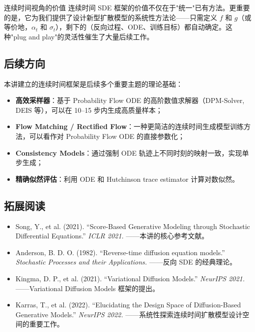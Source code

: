 \documentclass[a4paper]{article}
\begin{document}
\begin{importantbox}{连续时间视角的价值}
连续时间 SDE 框架的价值不仅在于"统一"已有方法。更重要的是，它为我们提供了设计新型扩散模型的系统性方法论——只需定义 $f$ 和 $g$（或等价地，$\alpha_t$ 和 $\sigma_t$），剩下的（反向过程、ODE、训练目标）都自动确定。这种"plug and play"的灵活性催生了大量后续工作。
\end{importantbox}

\subsection{后续方向}

本讲建立的连续时间框架是后续多个重要主题的理论基础：

\begin{itemize}
    \item \textbf{高效采样器}：基于 Probability Flow ODE 的高阶数值求解器（DPM-Solver, DEIS 等），可以在 10--15 步内生成高质量样本；
    \item \textbf{Flow Matching / Rectified Flow}：一种更简洁的连续时间生成模型训练方法，可以看作对 Probability Flow ODE 的直接参数化；
    \item \textbf{Consistency Models}：通过强制 ODE 轨迹上不同时刻的映射一致，实现单步生成；
    \item \textbf{精确似然评估}：利用 ODE 和 Hutchinson trace estimator 计算对数似然。
\end{itemize}

\subsection{拓展阅读}

\begin{itemize}
    \item Song, Y., et al. (2021). ``Score-Based Generative Modeling through Stochastic Differential Equations.'' \textit{ICLR 2021.} ——本讲的核心参考文献。
    \item Anderson, B. D. O. (1982). ``Reverse-time diffusion equation models.'' \textit{Stochastic Processes and their Applications.} ——反向 SDE 的经典理论。
    \item Kingma, D. P., et al. (2021). ``Variational Diffusion Models.'' \textit{NeurIPS 2021.} ——Variational Diffusion Models 框架的提出。
    \item Karras, T., et al. (2022). ``Elucidating the Design Space of Diffusion-Based Generative Models.'' \textit{NeurIPS 2022.} ——系统性探索连续时间扩散模型设计空间的重要工作。
\end{itemize}

\end{document}
